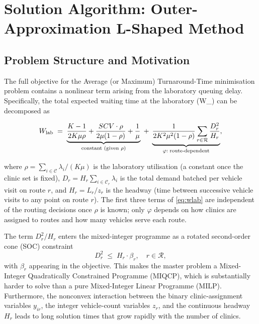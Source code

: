 
\section{Solution Algorithm: Outer-Approximation L-Shaped Method}
\label{sec:algorithm}

\subsection{Problem Structure and Motivation}

The full objective for the Average (or Maximum) Turnaround-Time
minimisation problem contains a nonlinear term arising from the
laboratory queuing delay.  Specifically, the total expected waiting
time at the laboratory (W_{}) can be decomposed as

\begin{equation}
  W_{\text{lab}}
  \;=\;
  \underbrace{%
    \frac{K-1}{2K\mu\rho}
    + \frac{SCV \cdot \rho}{2\mu(1-\rho)}
    + \frac{1}{\mu}
  }_{\text{constant (given }\rho\text{)}}
  \;+\;
  \underbrace{%
    \frac{1}{2K^{2}\mu^{2}(1-\rho)}
    \sum_{r \in \mathcal{R}} \frac{D_r^{2}}{H_r}
  }_{\varphi:\;\text{route-dependent}},
  \label{eq:wlab}
\end{equation}

where $\rho = \sum_{i\in\mathcal{C}} \lambda_i / (K\mu)$ is the
laboratory utilisation (a constant once the clinic set is fixed),
$D_r = H_r \sum_{i \in \mathcal{C}_r} \lambda_i$ is the total demand
batched per vehicle visit on route $r$, and $H_r = L_r / z_r$ is the
headway (time between successive vehicle visits to any point on route
$r$).  The first three terms of \eqref{eq:wlab} are independent of the
routing decisions once $\rho$ is known; only $\varphi$ depends on how
clinics are assigned to routes and how many vehicles serve each route.

The term $D_r^{2}/H_r$ enters the mixed-integer programme as a
rotated second-order cone (SOC) constraint
\begin{equation}
  D_r^{2} \;\leq\; H_r \cdot \beta_r, \quad r \in \mathcal{R},
  \label{eq:soc}
\end{equation}
with $\beta_r$ appearing in the objective.  This makes the master
problem a Mixed-Integer Quadratically Constrained Programme (MIQCP),
which is substantially harder to solve than a pure Mixed-Integer Linear
Programme (MILP).  Furthermore, the nonconvex interaction between the
binary clinic-assignment variables $y_{ir}$, the integer vehicle-count
variables $z_r$, and the continuous headway $H_r$ leads to long
solution times that grow rapidly with the number of clinics.

